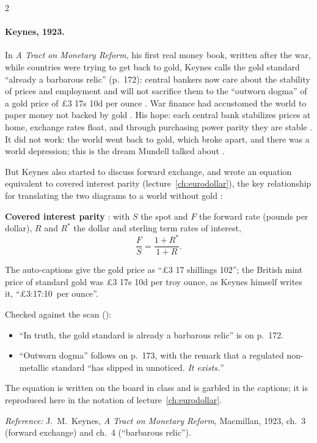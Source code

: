 \begin{paracol}{2}
\paragraph{Keynes, 1923.} In \emph{A Tract on Monetary Reform}, his first real money book, written after the war, while countries were trying to get back to gold,
Keynes calls the gold standard ``already a barbarous relic'' (p.~172): central bankers now care about the stability of prices and employment and will not
sacrifice them to the ``outworn dogma'' of a gold price of \pounds3 17s 10\textonehalf d per ounce .
War finance had accustomed the world to paper money not backed by gold . His hope: each central bank stabilizes prices at home,
exchange rates float, and through purchasing power parity they are stable . It did not work: the world went back to gold, which
broke apart, and there was a world depression; this is the dream Mundell talked about .

But Keynes also started to discuss forward exchange, and wrote an equation equivalent to covered interest parity (lecture~\ref{ch:eurodollar}), the key
relationship for translating the two diagrams to a world without gold :
\begin{keyformulas}
\textbf{Covered interest parity} : with $S$ the spot and $F$ the forward rate (pounds per dollar), $R$ and $R^\ast$ the dollar and sterling term
rates of interest,
\[
  \frac{F}{S}=\frac{1+R^\ast}{1+R}.
\]
\end{keyformulas}

\begin{coursenote}
The auto-captions give the gold price as ``\pounds3 17 shillings 102''; the British mint price of standard gold was \pounds3 17s 10\textonehalf d per troy
ounce, as Keynes himself writes it, ``\pounds3:17:10\textonehalf\ per ounce''.

Checked against the scan ():
\begin{itemize}
  \item ``In truth, the gold standard is already a barbarous relic'' is on p.~172.
  \item ``Outworn dogma'' follows on p.~173, with the remark that a regulated non-metallic standard ``has slipped in unnoticed. \emph{It exists.}''
\end{itemize}
The equation is written on the board in class and is garbled in the captions; it is reproduced here in the notation of lecture~\ref{ch:eurodollar}.
\par\emph{Reference:} J.~M.~Keynes, \emph{A Tract on Monetary Reform}, Macmillan, 1923, ch.~3 (forward exchange) and ch.~4 (``barbarous relic'').
\end{coursenote}


\end{paracol}
